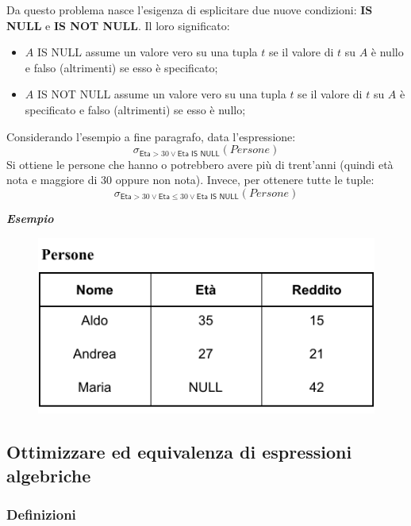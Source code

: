 \documentclass[a4paper]{article}
\begin{document}
	\noindent
	Da questo problema nasce l'esigenza di esplicitare due nuove condizioni: \textcolor{Red3}{\textbf{IS NULL}} e \textcolor{Red3}{\textbf{IS NOT NULL}}. Il loro significato:
	\begin{itemize}
		\item $A$ \textsf{IS NULL} assume un valore vero su una tupla $t$ se il valore di $t$ su $A$ è nullo e falso (altrimenti) se esso è specificato;
		
		\item $A$ \textsf{IS NOT NULL} assume un valore vero su una tupla $t$ se il valore di $t$ su $A$ è specificato e falso (altrimenti) se esso è nullo;
	\end{itemize}
	Considerando l'esempio a fine paragrafo, data l'espressione:
	\begin{equation*}
		\sigma_{\textsf{Eta} > 30 \lor \textsf{Eta IS NULL}}\left(Persone\right)
	\end{equation*}
	Si ottiene le persone che hanno o potrebbero avere più di trent'anni (quindi età nota e maggiore di 30 oppure non nota). Invece, per ottenere tutte le tuple:
	\begin{equation*}
		\sigma_{\textsf{Eta} > 30 \lor \textsf{Eta} \le 30 \lor \textsf{Eta IS NULL}}\left(Persone\right)
	\end{equation*}\newline

	\noindent
	\textcolor{Green4}{\textbf{\emph{Esempio}}}
	\begin{figure}[!htp]
		\centering
		\includegraphics[width=.6\textwidth]{img/valori_nulli.pdf}
	\end{figure}\newpage

	\subsection{Ottimizzare ed equivalenza di espressioni algebriche}
	
	\subsubsection{Definizioni}
	
\end{document}
